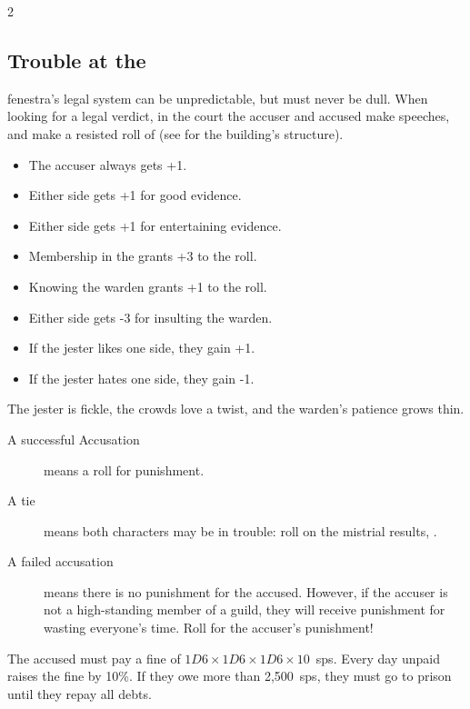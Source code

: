\begin{multicols}{2}
\subsection{Trouble at the }
\label{courtVerdicts}

\Gls{fenestra}'s legal system can be unpredictable, but must never be dull.
When looking for a legal verdict, in the \gls{court} the accuser and accused make speeches, and make a resisted roll of 
(see  for the building's structure).

\begin{itemize}
  \item
  The accuser always gets +1.
  \item
  Either side gets +1 for good evidence.
  \item
  Either side gets +1 for entertaining evidence.
  \item
  Membership in the  grants +3 to the roll.
  \item
  Knowing the \gls{warden} grants +1 to the roll.
  \item
  Either side gets -3 for insulting the \gls{warden}.
  \item
  If the jester likes one side, they gain +1.
  \item
  If the jester hates one side, they gain -1.
\end{itemize}

The jester is fickle, the crowds love a twist, and the \gls{warden}'s patience grows thin.

\begin{description}
  \item[A successful Accusation]
  means a roll for punishment.
  \item[A tie]
  means both characters may be in trouble: roll on the mistrial results, .
  \item[A failed accusation]
  means there is no punishment for the accused.
  However, if the accuser is not a high-standing member of a guild, they will receive punishment for wasting everyone's time.
  Roll for the accuser's punishment!
\end{description}

\begin{dlist}
  \item
  \ifodd\value{temperature}
    The accused must pay a fine of $1D6\times 1D6\times 1D6\times 10$~\glspl{sp}.
    Every day unpaid raises the fine by 10\%.
    If they owe more than 2,500~\glspl{sp}, they must go to prison until they repay all debts.


\end{dlist}
\end{multicols}
